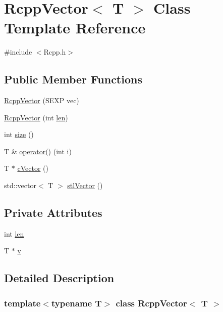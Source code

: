\hypertarget{classRcppVector}{
\section{RcppVector$<$ T $>$ Class Template Reference}
\label{classRcppVector}
}


{\ttfamily \#include $<$Rcpp.h$>$}\subsection*{Public Member Functions}
\begin{DoxyCompactItemize}
\item 
\hyperlink{classRcppVector_a0925b350f636a546e58ad0329786500a}{RcppVector} (SEXP vec)
\item 
\hyperlink{classRcppVector_aeb7797ca2b2ac2d03fee0a543993f17b}{RcppVector} (int \hyperlink{classRcppVector_a733f5ed23ade0723338904f9f08457d6}{len})
\item 
int \hyperlink{classRcppVector_a1e2424dc9b91014ba8b2c9351d97eb37}{size} ()
\item 
T \& \hyperlink{classRcppVector_a66aca1da0563af28e55768d98488a42d}{operator()} (int i)
\item 
T $\ast$ \hyperlink{classRcppVector_af4660a27a888a51693b02d2f51b47b08}{cVector} ()
\item 
std::vector$<$ T $>$ \hyperlink{classRcppVector_ac650f89b966962b167f3bc42aecf213b}{stlVector} ()
\end{DoxyCompactItemize}
\subsection*{Private Attributes}
\begin{DoxyCompactItemize}
\item 
int \hyperlink{classRcppVector_a733f5ed23ade0723338904f9f08457d6}{len}
\item 
T $\ast$ \hyperlink{classRcppVector_ac810c53db4c1b978bada104b38484b26}{v}
\end{DoxyCompactItemize}


\subsection{Detailed Description}
\subsubsection*{template$<$typename T$>$ class RcppVector$<$ T $>$}



